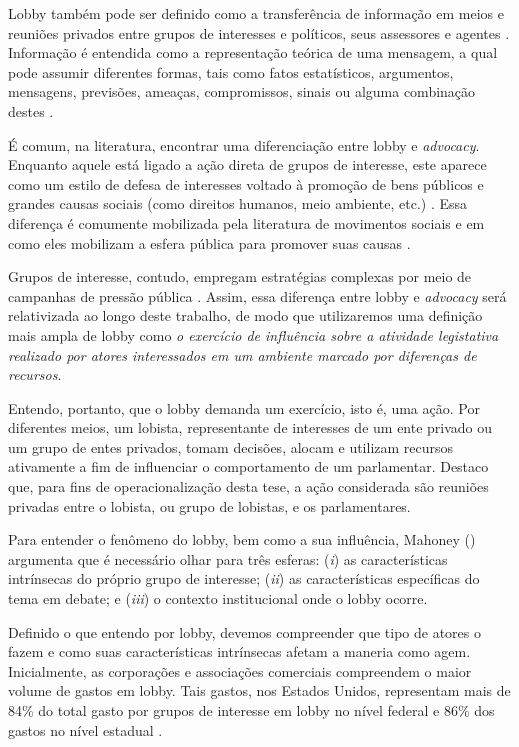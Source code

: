 Lobby também pode ser definido como a transferência de informação em meios e reuniões privados entre grupos de interesses e políticos, seus assessores e agentes \cite{de_figueiredo_advancing_2014}. Informação é entendida como a representação teórica de uma mensagem, a qual pode assumir diferentes formas, tais como fatos estatísticos, argumentos, mensagens, previsões, ameaças, compromissos, sinais ou alguma combinação destes \cite{de_figueiredo_advancing_2014}.

É comum, na literatura, encontrar uma diferenciação entre lobby e \textit{advocacy}. Enquanto aquele está ligado a ação direta de grupos de interesse, este aparece como um estilo de defesa de interesses voltado à promoção de bens públicos e grandes causas sociais (como direitos humanos, meio ambiente, etc.) \cite{mancuso2018}. Essa diferença é comumente mobilizada pela literatura de movimentos sociais e em como eles mobilizam a esfera pública para promover suas causas \cite{van2024rise}.

Grupos de interesse, contudo, empregam estratégias complexas  por meio de campanhas de pressão pública \cite{hall2012targeted}. Assim, essa diferença entre lobby e \textit{advocacy} será relativizada ao longo deste trabalho, de modo que utilizaremos uma definição mais ampla de lobby como \textit{o exercício de influência sobre a atividade legistativa realizado por atores interessados em um ambiente marcado por diferenças de recursos}.

Entendo, portanto, que o lobby demanda um exercício, isto é, uma ação. Por diferentes meios, um lobista, representante de interesses de um ente privado ou um grupo de entes privados, tomam decisões, alocam e utilizam recursos ativamente a fim de  influenciar o comportamento de um parlamentar. Destaco que, para fins de operacionalização desta tese, a ação considerada são reuniões privadas entre o lobista, ou grupo de lobistas, e os parlamentares.

Para entender o fenômeno do lobby, bem como a sua influência, Mahoney (\citeyear{mahoney_lobbying_2007}) argumenta que é necessário olhar para três esferas: (\textit{i}) as características intrínsecas do próprio grupo de interesse; (\textit{ii}) as características específicas do tema em debate; e (\textit{iii}) o contexto institucional onde o lobby ocorre.

Definido o que entendo por lobby, devemos compreender que tipo de atores o fazem e como suas características intrínsecas afetam a maneria como agem. Inicialmente, as corporações e associações comerciais compreendem o maior volume de gastos em lobby. Tais gastos, nos Estados Unidos, representam mais de 84\% do total gasto por grupos de interesse em lobby no nível federal e 86\% dos gastos no nível estadual \cite{de_figueiredo_advancing_2014}.

